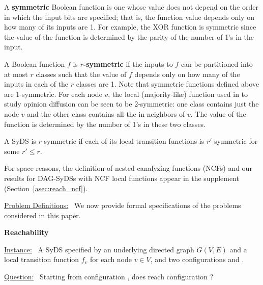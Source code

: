 A \textbf{symmetric} Boolean function is one whose
value does not depend on the order in
which the input bits are specified;
that is, the function value depends only on how many
of its inputs are 1.
For example, the XOR function is symmetric since the 
value of the function is determined by the parity of the number 
of 1's in the input.

A Boolean function $f$ is \textbf{$r$-symmetric}
if the inputs to $f$ can be partitioned into at most $r$ classes
such that the value of $f$ depends only on how many of the
inputs in each of the $r$ classes are 1.
Note that symmetric functions defined above are 1-symmetric.
For each node $v$, the local (majority-like) function 
used in \cite{Chistikov-etal-2020}
to study opinion diffusion can be seen to be 2-symmetric:
one class contains just the node $v$ and the other class
contains all the in-neighbors of $v$.
The value of the function is determined by the number
of 1's in these two classes.

A SyDS is $r$-symmetric
if each of its local transition
functions is $r'$-symmetric for some $r' \leq r$.

For space reasons, the definition of nested canalyzing
functions (NCFs) and our results for DAG-SyDSs
with NCF local functions appear in the supplement
(Section~\ref{asec:reach_ncf}).

\smallskip
\noindent
\underline{\textsf{Problem Definitions:}}~ We now provide
formal specifications of the problems considered in this paper.

\smallskip
\noindent
\textbf{Reachability} %

\smallskip
\noindent
\underline{\textsf{Instance:}}~ A SyDS \cals{} specified 
by an underlying directed
graph $G(V,E)$ and a local transition function $f_v$ for each node $v \in V$,
and two configurations \calc{} and \cald{}. 

\noindent
\underline{\textsf{Question:}}~ Starting from configuration \calc,
does \cals{} reach configuration \cald? 

\iffalse
We observe that \textsc{Reach} is solvable in polynomial time for
any class of SyDSs for which function evaluation can be done in
polynomial time and there is a polynomial bound on the length of a
phase space cycle and the length of a transient.  In such a case,
the given SyDS can be simulated for the required number of steps.
As will be seen, this approach is applicable to NCFs, monotone
functions (with both positive and negative monotone functions allowed
in \cals{}), and bithreshold functions.
\fi


